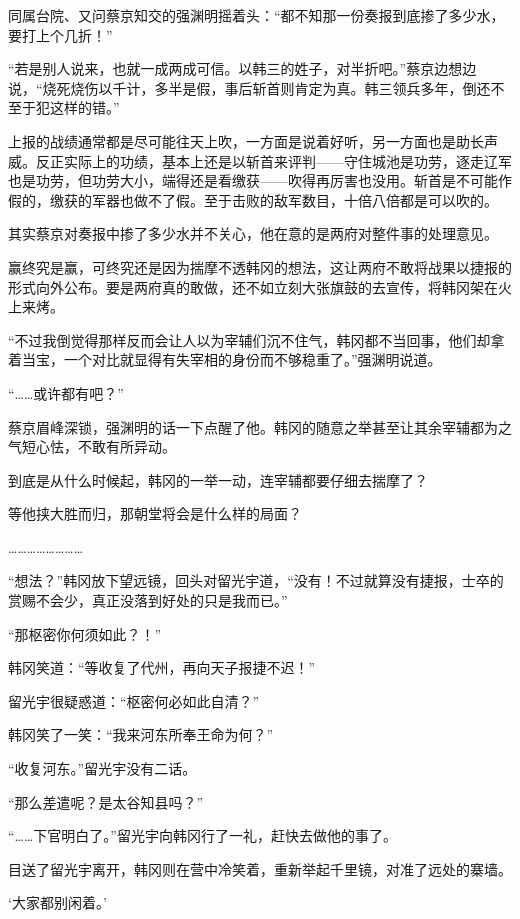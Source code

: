 同属台院、又问蔡京知交的强渊明摇着头：“都不知那一份奏报到底掺了多少水，要打上个几折！”

“若是别人说来，也就一成两成可信。以韩三的姓子，对半折吧。”蔡京边想边说，“烧死烧伤以千计，多半是假，事后斩首则肯定为真。韩三领兵多年，倒还不至于犯这样的错。”

上报的战绩通常都是尽可能往天上吹，一方面是说着好听，另一方面也是助长声威。反正实际上的功绩，基本上还是以斩首来评判——守住城池是功劳，逐走辽军也是功劳，但功劳大小，端得还是看缴获——吹得再厉害也没用。斩首是不可能作假的，缴获的军器也做不了假。至于击败的敌军数目，十倍八倍都是可以吹的。

其实蔡京对奏报中掺了多少水并不关心，他在意的是两府对整件事的处理意见。

赢终究是赢，可终究还是因为揣摩不透韩冈的想法，这让两府不敢将战果以捷报的形式向外公布。要是两府真的敢做，还不如立刻大张旗鼓的去宣传，将韩冈架在火上来烤。

“不过我倒觉得那样反而会让人以为宰辅们沉不住气，韩冈都不当回事，他们却拿着当宝，一个对比就显得有失宰相的身份而不够稳重了。”强渊明说道。

“……或许都有吧？”

蔡京眉峰深锁，强渊明的话一下点醒了他。韩冈的随意之举甚至让其余宰辅都为之气短心怯，不敢有所异动。

到底是从什么时候起，韩冈的一举一动，连宰辅都要仔细去揣摩了？

等他挟大胜而归，那朝堂将会是什么样的局面？

……………………

“想法？”韩冈放下望远镜，回头对留光宇道，“没有！不过就算没有捷报，士卒的赏赐不会少，真正没落到好处的只是我而已。”

“那枢密你何须如此？！”

韩冈笑道：“等收复了代州，再向天子报捷不迟！”

留光宇很疑惑道：“枢密何必如此自清？”

韩冈笑了一笑：“我来河东所奉王命为何？”

“收复河东。”留光宇没有二话。

“那么差遣呢？是太谷知县吗？”

“……下官明白了。”留光宇向韩冈行了一礼，赶快去做他的事了。

目送了留光宇离开，韩冈则在营中冷笑着，重新举起千里镜，对准了远处的寨墙。

‘大家都别闲着。’

